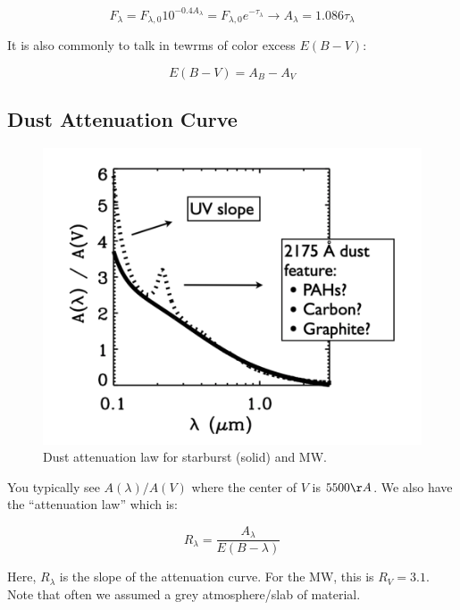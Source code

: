 \documentclass{article}
\begin{document}
\begin{equation}
    F_\lambda = F_{\lambda,0} 10^{-0.4A_\lambda}  = F_{\lambda,0} e^{-\tau_\lambda} \rightarrow A_\lambda = 1.086 \tau_\lambda
\end{equation}

It is also commonly to talk in tewrms of color excess $E(B-V)$:

\begin{equation}
    E(B-V) = A_B - A_V
\end{equation}

\subsection{Dust Attenuation Curve}

\begin{figure}
    \centering
    \includegraphics{figs/Screen Shot 2021-09-17 at 9.22.20 AM.png}
    \caption{Dust attenuation law for starburst (solid) and MW. }
    \label{fig:dust_atten}
\end{figure}

You typically see $A(\lambda)/A(V)$ where the center of $V$ is $5500\AA$. We also have the ``attenuation law'' which is:

\begin{equation}
    R_\lambda = \frac{A_\lambda}{E(B-\lambda)}
\end{equation}

Here, $R_\lambda$ is the slope of the attenuation curve. For the MW, this is $R_V = 3.1$. Note that often we assumed a grey atmosphere/slab of material. 
\end{document}
